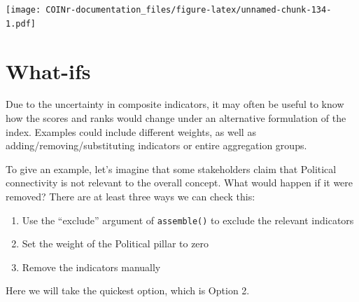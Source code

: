 \documentclass[
]{book}
\providecommand{\tightlist}{%
  \setlength{\itemsep}{0pt}\setlength{\parskip}{0pt}}
\begin{document}
\texttt{[image: COINr-documentation\_files/figure-latex/unnamed-chunk-134-1.pdf]}

\hypertarget{what-ifs}{%
\section{What-ifs}\label{what-ifs}}

Due to the uncertainty in composite indicators, it may often be useful to know how the scores and ranks would change under an alternative formulation of the index. Examples could include different weights, as well as adding/removing/substituting indicators or entire aggregation groups.

To give an example, let's imagine that some stakeholders claim that Political connectivity is not relevant to the overall concept. What would happen if it were removed? There are at least three ways we can check this:

\begin{enumerate}
\def\labelenumi{\arabic{enumi}.}
\tightlist
\item
  Use the ``exclude'' argument of \texttt{assemble()} to exclude the relevant indicators
\item
  Set the weight of the Political pillar to zero
\item
  Remove the indicators manually
\end{enumerate}

Here we will take the quickest option, which is Option 2.
\end{document}
